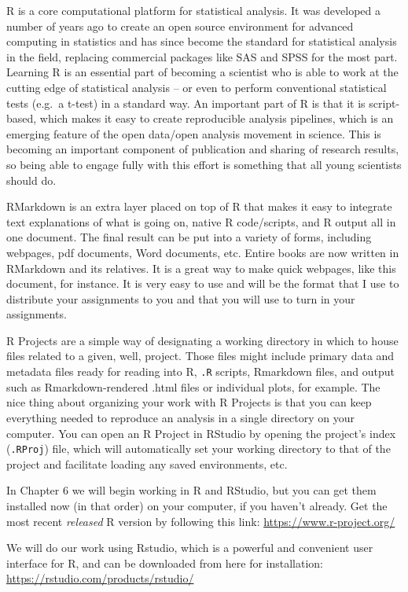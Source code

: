 \documentclass[]{book}
\begin{document}
R is a core computational platform for statistical analysis. It was developed a number of years ago to create an open source environment for advanced computing in statistics and has since become the standard for statistical analysis in the field, replacing commercial packages like SAS and SPSS for the most part. Learning R is an essential part of becoming a scientist who is able to work at the cutting edge of statistical analysis -- or even to perform conventional statistical tests (e.g.~a t-test) in a standard way. An important part of R is that it is script-based, which makes it easy to create reproducible analysis pipelines, which is an emerging feature of the open data/open analysis movement in science. This is becoming an important component of publication and sharing of research results, so being able to engage fully with this effort is something that all young scientists should do.

RMarkdown is an extra layer placed on top of R that makes it easy to integrate text explanations of what is going on, native R code/scripts, and R output all in one document. The final result can be put into a variety of forms, including webpages, pdf documents, Word documents, etc. Entire books are now written in RMarkdown and its relatives. It is a great way to make quick webpages, like this document, for instance. It is very easy to use and will be the format that I use to distribute your assignments to you and that you will use to turn in your assignments.

R Projects are a simple way of designating a working directory in which to house files related to a given, well, project. Those files might include primary data and metadata files ready for reading into R, \texttt{.R} scripts, Rmarkdown files, and output such as Rmarkdown-rendered .html files or individual plots, for example. The nice thing about organizing your work with R Projects is that you can keep everything needed to reproduce an analysis in a single directory on your computer. You can open an R Project in RStudio by opening the project's index (\texttt{.RProj}) file, which will automatically set your working directory to that of the project and facilitate loading any saved environments, etc.

In Chapter 6 we will begin working in R and RStudio, but you can get them installed now (in that order) on your computer, if you haven't already. Get the most recent \emph{released} R version by following this link:
\url{https://www.r-project.org/}

We will do our work using Rstudio, which is a powerful and convenient user interface for R, and can be downloaded from here for installation:
\url{https://rstudio.com/products/rstudio/}
\end{document}
